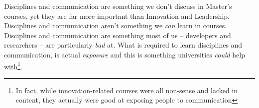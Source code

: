 Disciplines and communication are something we don't discuss in Master's
courses, yet they are far more important than Innovation and Leadership.
Disciplines and communication aren't something we \emph{can} learn in courses.
Disciplines and communication are something most of us -- developers and
researchers -- are particularly \emph{bad} at.  What is required to learn
disciplines and communication, is actual \emph{exposure} and this is something
universities \emph{could} help with\footnote{In fact, while innovation-related courses
were all non-sense and lacked in content, they actually were good at exposing people
to communication}.
